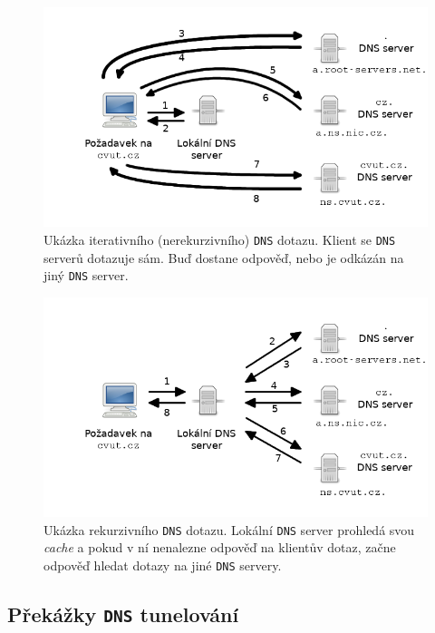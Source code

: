 \documentclass[thesis=M,czech]{FITthesis}[2012/10/20]
\begin{document}
    \clearpage
    
    

  \begin{figure}
  \centering
    \includegraphics[width=\textwidth]{attachments/dns_iterative.png}
    \caption{Ukázka iterativního (nerekurzivního) \texttt{DNS} dotazu. Klient se \texttt{DNS} serverů dotazuje sám. Buď dostane odpověď, nebo je odkázán na jiný \texttt{DNS} server.}
    \label{pic:dns-iterative}
  \end{figure}
    
  \begin{figure}
  \centering
    \includegraphics[width=\textwidth]{attachments/dns_recursive.png}
    \caption{Ukázka rekurzivního \texttt{DNS} dotazu. Lokální \texttt{DNS} server prohledá svou \textit{cache} a pokud v ní nenalezne odpověď na klientův dotaz, začne odpověď hledat dotazy na jiné \texttt{DNS} servery.}
    \label{pic:dns-recursive}
  \end{figure}


\vfil
\clearpage

    \subsection{Překážky \texttt{DNS} tunelování}
\end{document}
